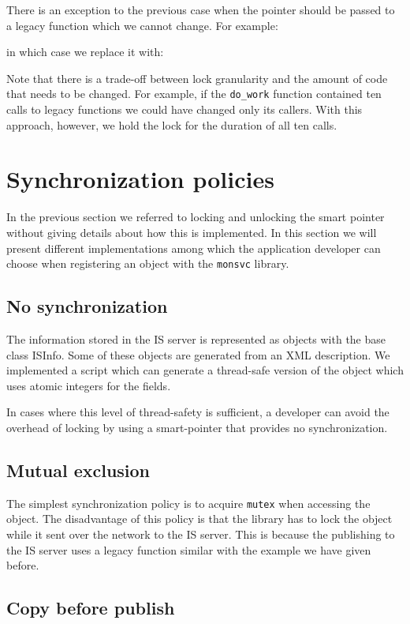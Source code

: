 There is an exception to the previous case when the pointer should be passed to a legacy function which we cannot change. For example:

in which case we replace it with:


Note that there is a trade-off between lock granularity and the amount of code that needs to be changed. For example, if the \verb+do_work+ function contained ten calls to legacy functions we could have changed only its callers. With this approach, however, we hold the lock for the duration of all ten calls.

\section{Synchronization policies}

In the previous section we referred to locking and unlocking the smart pointer without giving details about how this is implemented. In this section we will present different implementations among which the application developer can choose when registering an object with the {\tt monsvc} library.

\subsection{No synchronization}

The information stored in the IS server is represented as objects with the base class ISInfo. Some of these objects are generated from an XML description. We implemented a script which can generate a thread-safe version of the object which uses atomic integers for the fields. 

In cases where this level of thread-safety is sufficient, a developer can avoid the overhead of locking by using a smart-pointer that provides no synchronization.

\subsection{Mutual exclusion}

The simplest synchronization policy is to acquire \verb+mutex+ when accessing the object. The disadvantage of this policy is that the library has to lock the object while it sent over the network to the IS server. This is because the publishing to the IS server uses a legacy function similar with the example we have given before.

\subsection{Copy before publish}

